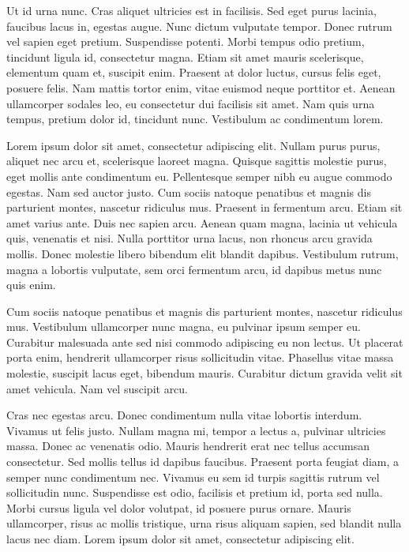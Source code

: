 \documentclass{book}
\begin{document}
\pstart Ut id urna nunc. Cras aliquet ultricies est in facilisis. Sed eget purus lacinia, faucibus lacus in, egestas augue. Nunc dictum vulputate tempor. Donec rutrum vel sapien eget pretium. Suspendisse potenti. Morbi tempus odio pretium, tincidunt ligula id, consectetur magna. Etiam sit amet mauris scelerisque, elementum quam et, suscipit enim. Praesent at dolor luctus, cursus felis eget, posuere felis. Nam mattis tortor enim, vitae euismod neque porttitor et. Aenean ullamcorper sodales leo, eu consectetur dui facilisis sit amet. Nam quis urna tempus, pretium dolor id, tincidunt nunc. Vestibulum ac condimentum lorem.
\pend

\pstart Lorem ipsum dolor sit amet, consectetur adipiscing elit. Nullam purus purus, aliquet nec arcu et, scelerisque laoreet magna. Quisque sagittis molestie purus, eget mollis ante condimentum eu. Pellentesque semper nibh eu augue commodo egestas. Nam sed auctor justo. Cum sociis natoque penatibus et magnis dis parturient montes, nascetur ridiculus mus. Praesent in fermentum arcu. Etiam sit amet varius ante. Duis nec sapien arcu. Aenean quam magna, lacinia ut vehicula quis, venenatis et nisi. Nulla porttitor urna lacus, non rhoncus arcu gravida mollis. Donec molestie libero bibendum elit blandit dapibus. Vestibulum rutrum, magna a lobortis vulputate, sem orci fermentum arcu, id dapibus metus nunc quis enim.
\pend

\pstart Cum sociis natoque penatibus et magnis dis parturient montes, nascetur ridiculus mus. Vestibulum ullamcorper nunc magna, eu pulvinar ipsum semper eu. Curabitur malesuada ante sed nisi commodo adipiscing eu non lectus. Ut placerat porta enim, hendrerit ullamcorper risus sollicitudin vitae. Phasellus vitae massa molestie, suscipit lacus eget, bibendum mauris. Curabitur dictum gravida velit sit amet vehicula. Nam vel suscipit arcu.
\pend

\pstart Cras nec egestas arcu. Donec condimentum nulla vitae lobortis interdum. Vivamus ut felis justo. Nullam magna mi, tempor a lectus a, pulvinar ultricies massa. Donec ac venenatis odio. Mauris hendrerit erat nec tellus accumsan consectetur. Sed mollis tellus id dapibus faucibus. Praesent porta feugiat diam, a semper nunc condimentum nec. Vivamus eu sem id turpis sagittis rutrum vel sollicitudin nunc. Suspendisse est odio, facilisis et pretium id, porta sed nulla. Morbi cursus ligula vel dolor volutpat, id posuere purus ornare. Mauris ullamcorper, risus ac mollis tristique, urna risus aliquam sapien, sed blandit nulla lacus nec diam. Lorem ipsum dolor sit amet, consectetur adipiscing elit.
\pend
\end{document}
